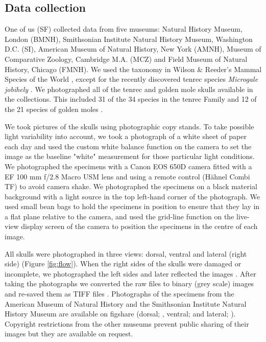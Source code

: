 \documentclass[12pt,a4paper]{article}
\begin{document}
\subsection{Data collection}
	One of us (SF) collected data from five museums: Natural History Museum, London (BMNH), Smithsonian Institute Natural History Museum, Washington D.C. (SI), American Museum of Natural History, New York (AMNH), Museum of Comparative Zoology, Cambridge M.A. (MCZ) and Field Museum of Natural History, Chicago (FMNH). We used the taxonomy in Wilson \& Reeder's Mammal Species of the World \citeyearpar{Wilson2005}, except for the recently discovered tenrec species \textit{Microgale jobihely} \citep{Goodman2006}. We photographed all of the tenrec and golden mole skulls available in the collections. This included 31 of the 34 species in the tenrec Family \citep{Olson2013} and 12 of the 21 species of golden moles \citep{Wilson2005}.
	
	We took pictures of the skulls using photographic copy stands. To take possible light variability into account, we took a photograph of a white sheet of paper each day and used the custom white balance function on the camera to set the image as the baseline "white" measurement for those particular light conditions. We photographed the specimens with a Canon EOS 650D camera fitted with a EF 100 mm f/2.8 Macro USM lens and using a remote control (H\"ahnel Combi TF) to avoid camera shake. We photographed the specimens on a black material background with a light source in the top left-hand corner of the photograph. We used small bean bags to hold the specimens in position to ensure that they lay in a flat plane relative to the camera, and used the grid-line function on the live-view display screen of the camera to position the specimens in the centre of each image. 
	
	All skulls were photographed in three views: dorsal, ventral and lateral (right side) (Figure \ref{fig:flow}). When the right sides of the skulls were damaged or incomplete, we photographed the left sides and later reflected the images \citep[e.g.][]{Barrow2008}. After taking the photographs we converted the raw files to binary (grey scale) images and re-saved them as TIFF files \citep[uncompressed files preserve greater detail, ][]{RHOI2013}. Photographs of the specimens from the American Museum of Natural History and the Smithsonian Institute Natural History Museum are available on figshare (dorsal; \citet{Finlay2013d}, ventral; \citet{Finlay2013v} and lateral; \citet{Finlay2013l}). Copyright restrictions from the other museums prevent public sharing of their images but they are available on request.
\end{document}

